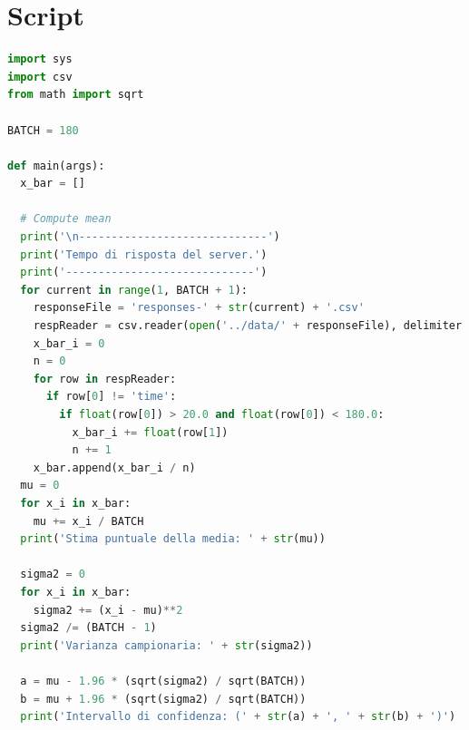 \documentclass[a4paper, 11pt, oneside]{book}
\theoremstyle{definition}
\theoremstyle{remark}
\begin{document}
\chapter{Script}\label{script}
\begin{lstlisting}[language = Python,
                   title = {Calcolo di media, varianza e intervalli di
confidenza.}
                  ]
import sys
import csv
from math import sqrt

BATCH = 180

def main(args):
  x_bar = []

  # Compute mean
  print('\n-----------------------------')
  print('Tempo di risposta del server.')
  print('-----------------------------')
  for current in range(1, BATCH + 1):
    responseFile = 'responses-' + str(current) + '.csv'
    respReader = csv.reader(open('../data/' + responseFile), delimiter = ',')
    x_bar_i = 0
    n = 0
    for row in respReader:
      if row[0] != 'time':
        if float(row[0]) > 20.0 and float(row[0]) < 180.0:
          x_bar_i += float(row[1])
          n += 1
    x_bar.append(x_bar_i / n)
  mu = 0
  for x_i in x_bar:
    mu += x_i / BATCH
  print('Stima puntuale della media: ' + str(mu))

  sigma2 = 0
  for x_i in x_bar:
    sigma2 += (x_i - mu)**2
  sigma2 /= (BATCH - 1)
  print('Varianza campionaria: ' + str(sigma2))

  a = mu - 1.96 * (sqrt(sigma2) / sqrt(BATCH))
  b = mu + 1.96 * (sqrt(sigma2) / sqrt(BATCH))
  print('Intervallo di confidenza: (' + str(a) + ', ' + str(b) + ')')
\end{lstlisting}



\end{document}
